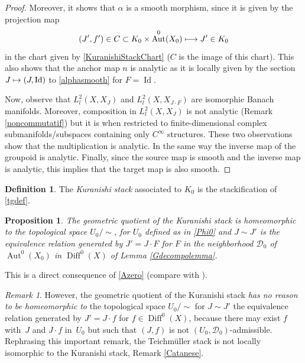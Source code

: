 \documentclass[JEP,XML,SOM,Unicode]{cedram}
\let\mathcal\mathscr
\def\mto{\mathchoice{\longmapsto}{\mapsto}{\mapsto}{\mapsto}}
\DeclareMathOperator{\Aut}{Aut}
\DeclareMathOperator{\Diff}{Diff}
\DeclareMathOperator{\Id}{Id}
\theoremstyle{plain}
\newtheorem{proposition}[theorem]{Proposition}
\theoremstyle{definition}
\newtheorem{definition}[theorem]{Definition}
\theoremstyle{remark}
\newtheorem{remark}[theorem]{Remark}
\numberwithin{equation}{section}
\newcommand{\Azero}{\Aut^0(X_0)}
\newcommand{\D}{\Diff^0(X)}
\begin{document}
\begin{proof}
Moreover, it shows that $\alpha$ is a smooth morphism, since it is given by the projection map
\begin{equation}
\label{alphasmooth}
(J',f')\in C\subset K_0\times\Azero\mto J'\in K_0
\end{equation}
in the chart given by \eqref{KuranishiStackChart} ($C$ is the image of this chart). This also shows that the anchor map $n$ is analytic as it is locally given by the section $J\mto (J,\Id)$ to \eqref{alphasmooth} for $F=\Id$.

Now, observe that $L^2_l(X,X_J)$ and $L^2_l(X,X_{J\cdot F})$ are isomorphic Banach manifolds. Moreover, composition in $L^2_l(X,X_J)$ is not analytic (\cf Remark \ref{noncommutatif}) but it is when restricted to finite-dimensional complex submanifolds/subspaces containing only $C^\infty$ structures. These two observations show that the multiplication is analytic. In the same way the inverse map of the groupoid is analytic. Finally, since the source map is smooth and the inverse map is analytic, this implies that the target map is also smooth.
\end{proof}
\begin{definition}
The \emph{Kuranishi stack} associated to $K_0$ is the stackification of \eqref{tgdef}.
\end{definition}

\begin{proposition}
\label{geometricquotient}
The geometric quotient of the Kuranishi stack is homeomorphic to the topological space $U_0/\sim$, for $U_0$ defined as in \eqref{Phi0} and $J\sim J'$ is the equivalence relation generated by $J'=J\cdot F$ for $F$ in the neighborhood $\mathcal D_0$ of $\Azero$ in $\D$ of Lemma \ref{Gdecompolemma}.
\end{proposition}

This is a direct consequence of \eqref{Azero} (compare with \cite{KuranishiNote}).

\begin{remark}
\label{localmodeldifference}
However, the geometric quotient of the Kuranishi stack \emph{has no reason to be homeomorphic to} the topological space $U_0/\sim$ for $J\sim J'$ the equivalence relation generated by $J'=J\cdot f$ for $f\in\D$, because there may exist $f$ with~$J$ and $J\cdot f$ in~$U_0$ but such that $(J,f)$ is not $(U_0,\mathcal D_0)$-admissible. Rephrasing this important remark, the Teichmüller stack is not locally isomorphic to the Kuranishi stack, \cf Remark \ref{Catanese}.
\end{remark}
\end{document}
